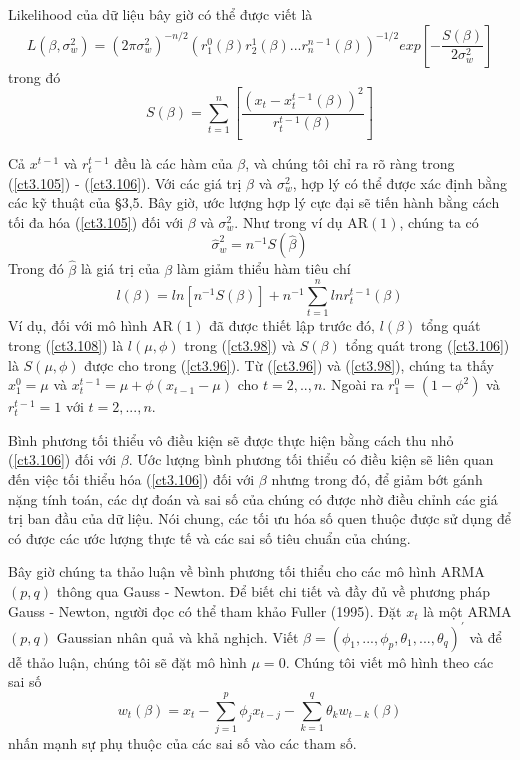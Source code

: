\documentclass[12pt, a4paper,oneside]{book}
\theoremstyle{definition}
\begin{document}
Likelihood của dữ liệu bây giờ có thể được viết là
\begin{equation} L(\beta,\sigma_{w}^2)=(2\pi\sigma_{w}^2)^{-n/2}(r^0_1(\beta)r^1_2(\beta)...r^{n-1}_{n}(\beta))^{-1/2}exp[-\dfrac{S(\beta)}{2\sigma_{w}^2}] \label{ct3.105}
\end{equation}
trong đó
\begin{equation}
S(\beta)=\sum_{t=1}^{n}[\dfrac{(x_{t}-x^{t-1}_{t}(\beta))^{2}}{r^{t-1}_{t}(\beta)}] \label{ct3.106}
\end{equation}

Cả $ x^{t-1} $ và $ r^{t-1}_{t} $ đều là các hàm của $ \beta $, và chúng tôi chỉ ra rõ ràng trong (\ref{ct3.105}) - (\ref{ct3.106}). Với các giá trị $\beta$ và $ \sigma_{w}^2 $, hợp lý có thể được xác định bằng các kỹ thuật của §3,5. Bây giờ, ước lượng hợp lý cực đại sẽ tiến hành bằng cách tối đa hóa (\ref{ct3.105}) đối với $\beta$ và $ \sigma_{w}^2 $. Như trong ví dụ AR$(1)$, chúng ta có
\begin{equation}
\hat{\sigma}^{2}_{w}=n^{-1}S(\hat{\beta}) \label{ct3.107}
\end{equation}
Trong đó $ \hat{\beta} $ là giá trị của $ \beta $ làm giảm thiểu hàm tiêu chí
\begin{equation}
l(\beta)=ln[n^{-1}S(\beta)]+n^{-1}\sum_{t=1}^{n}lnr^{t-1}_{t}(\beta) \label{ct3.108}
\end{equation}
Ví dụ, đối với mô hình AR$(1)$ đã được thiết lập trước đó, $ l(\beta) $ tổng quát trong (\ref{ct3.108}) là $ l(\mu,\phi) $ trong (\ref{ct3.98}) và $ S(\beta) $ tổng quát trong (\ref{ct3.106}) là $ S(\mu,\phi) $ được cho trong (\ref{ct3.96}). Từ (\ref{ct3.96}) và (\ref{ct3.98}), chúng ta thấy $ x^0_1=\mu $ và $ x^{t-1}_{t}=\mu + \phi(x_{t-1}-\mu) $ cho $ t=2,..,n $. Ngoài ra $ r^0_1=(1-\phi^{2}) $ và $ r^{t-1}_{t}= 1 $ với $ t=2,...,n $.

Bình phương tối thiểu vô điều kiện sẽ được thực hiện bằng cách thu nhỏ (\ref{ct3.106}) đối với $ \beta $. Ước lượng bình phương tối thiểu có điều kiện sẽ liên quan đến việc tối thiểu hóa (\ref{ct3.106}) đối với $ \beta $ nhưng trong đó, để giảm bớt gánh nặng tính toán, các dự đoán và sai số của chúng có được nhờ điều chỉnh các giá trị ban đầu của dữ liệu. Nói chung, các tối ưu hóa số quen thuộc được sử dụng để có được các ước lượng thực tế và các sai số tiêu chuẩn của chúng. 

Bây giờ chúng ta thảo luận về bình phương tối thiểu cho các mô hình ARMA$(p,q)$ thông qua Gauss - Newton. Để biết chi tiết và đầy đủ về phương pháp Gauss - Newton, người đọc có thể tham khảo Fuller (1995). Đặt $ x_{t} $ là một  ARMA$ (p,q) $ Gaussian nhân quả và khả nghịch. Viết  $\beta=(\phi_{1},...,\phi_{p},\theta_{1},...,\theta_{q})^{\prime} $ và để dễ thảo luận, chúng tôi sẽ đặt mô hình $ \mu=0 $. Chúng tôi viết mô hình theo các sai số
\begin{equation}
w_{t}(\beta)=x_t - \sum_{j=1}^{p}\phi_j x_{t-j} - \sum_{k=1}^{q}\theta_k w_{t-k}(\beta) \label{ct3.109}
\end{equation}
nhấn mạnh sự phụ thuộc của các sai số vào các tham số. 
\end{document}
